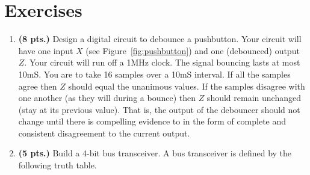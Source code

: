 \section{Exercises}
\label{section:commonperipheralComponents}
\graphicspath{ {./chapter10/FigHw} }

\begin{enumerate}

\item \textbf{ (8 pts.)}
Design a digital circuit to debounce a pushbutton.  Your circuit
will have one input $X$ (see Figure~\ref{fig:pushbutton}) and
one (debounced) output $Z$. Your circuit will run off a 1MHz clock.  
The signal bouncing lasts at most 10mS.  You are to take 16 samples 
over a 10mS interval.  If all the samples agree then $Z$ should
equal the unanimous values.  If the samples disagree with one
another (as they will during a bounce) then $Z$ should remain
unchanged (stay at its previous value).  That is, the output of 
the debouncer should not change until there is compelling evidence to
in the form of complete and consistent disagreement to the current
output.

\item\textbf{ (5 pts.)} Build a 4-bit bus transceiver.  A bus transceiver
is defined by the following truth table.
                                                                                

\end{enumerate}
